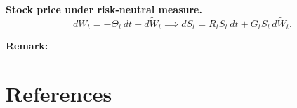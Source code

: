 \documentclass[
  letterpaper,
  DIV=11,
  numbers=noendperiod]{scrreprt}
\theoremstyle{definition}
\theoremstyle{plain}
\theoremstyle{plain}
\theoremstyle{definition}
\theoremstyle{plain}
\theoremstyle{plain}
\theoremstyle{remark}
\begin{document}
\textbf{Stock price under risk-neutral measure.} \[
dW_t = -\Theta_t \, dt + d\widetilde{W}_t \implies dS_t = R_t S_t \, dt + G_t S_t \, d\widetilde{W}_t.
\]

\textbf{Remark:}


\chapter*{References}\label{references}


\label{refs}
\end{document}
